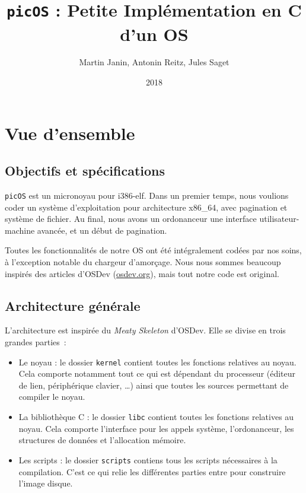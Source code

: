 \documentclass[a4paper,11pt]{article}
\title{\texttt{picOS} : Petite Implémentation en C d'un OS}
\author{Martin Janin, Antonin Reitz, Jules Saget}
\date{2018}
\begin{document}
\maketitle

\section{Vue d'ensemble}

\subsection{Objectifs et spécifications}

\texttt{picOS} est un micronoyau pour i386-elf. Dans un premier temps, nous
voulions coder un système d'exploitation pour architecture x86\_64, avec
pagination et système de fichier. Au final, nous avons un ordonanceur une
interface utilisateur-machine avancée, et un début de pagination.

Toutes les fonctionnalités de notre OS ont été intégralement codées par nos
soins, à l'exception notable du chargeur d'amorçage. Nous nous sommes beaucoup
inspirés des articles d'OSDev (\url{osdev.org}), mais tout notre code est
original.

\subsection{Architecture générale}

L'architecture est inspirée du \emph{Meaty Skeleton} d'OSDev. Elle se divise en
trois grandes parties~:
\begin{itemize}
  \item Le noyau : le dossier \texttt{kernel} contient toutes les fonctions
    relatives au noyau. Cela comporte notamment tout ce qui est dépendant du
    processeur (éditeur de lien, périphérique clavier, \ldots) ainsi que toutes
    les sources permettant de compiler le noyau.
  \item La bibliothèque C : le dossier \texttt{libc} contient toutes les
    fonctions relatives au noyau. Cela comporte l'interface pour les appels
    système, l'ordonanceur, les structures de données et l'allocation mémoire.
  \item Les scripts : le dossier \texttt{scripts} contiens tous les scripts
    nécessaires à la compilation. C'est ce qui relie les différentes parties
    entre pour construire l'image disque.
\end{itemize}
\end{document}
